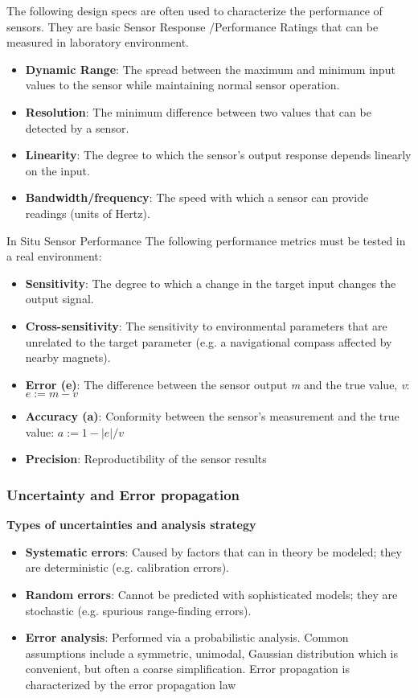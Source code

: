 The following design specs are often used to characterize the performance of sensors. They are basic Sensor Response /Performance Ratings that can be measured in laboratory environment.
\begin{itemize}
  \item \textbf{Dynamic Range}: The spread between the maximum and minimum input values to the sensor while maintaining normal sensor operation.
  \item \textbf{Resolution}: The minimum difference between two values that can be detected by a sensor.
  \item \textbf{Linearity}: The degree to which the sensor's output response depends linearly on the input.
 \item \textbf{Bandwidth/frequency}: The speed with which a sensor can provide readings (units of Hertz).
\end{itemize}

In Situ Sensor Performance
The following performance metrics must be tested in a real environment:
\begin{itemize}
  \item \textbf{Sensitivity}: The degree to which a change in the target input changes the output signal.
  \item \textbf{Cross-sensitivity}: The sensitivity to environmental parameters that are unrelated to the target parameter (e.g. a navigational compass affected by nearby magnets).
  \item \textbf{Error (e)}: The difference between the sensor output \textit{m} and the true value, \textit{v}: $e:=m-v$
 \item \textbf{Accuracy (a)}: Conformity between the sensor's measurement and the true value: $a:=1-|e|/v$
 \item \textbf{Precision}: Reproductibility of the sensor results
\end{itemize}

\subsubsection{Uncertainty and Error propagation}
\textbf{Types of uncertainties and analysis strategy}
\begin{itemize}
    \item \textbf{Systematic errors}: Caused by factors that can in theory be modeled; they are deterministic (e.g. calibration errors).
    \item \textbf{Random errors}: Cannot be predicted with sophisticated models; they are stochastic (e.g. spurious range-finding errors).
    \item \textbf{Error analysis}: Performed via a probabilistic analysis. Common assumptions include a symmetric, unimodal, Gaussian distribution which is convenient, but often a coarse simplification. Error propagation is characterized by the error propagation law
\end{itemize}

